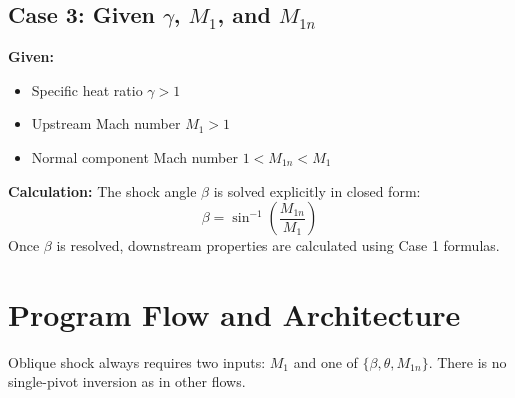 \subsection*{Case 3: Given $\gamma$, $M_1$, and $M_{1n}$}

\textbf{Given:}
\begin{itemize}[nosep]
    \item Specific heat ratio $\gamma > 1$
    \item Upstream Mach number $M_1 > 1$
    \item Normal component Mach number $1 < M_{1n} < M_1$
\end{itemize}

\textbf{Calculation:} The shock angle $\beta$ is solved explicitly in closed form:
\begin{equation}
\beta = \sin^{-1}\left(\frac{M_{1n}}{M_1}\right)
\end{equation}
Once $\beta$ is resolved, downstream properties are calculated using Case 1 formulas.




\section{Program Flow and Architecture}

Oblique shock always requires two inputs: $M_1$ and one of $\{\beta,\theta,M_{1n}\}$. There is no single-pivot inversion as in other flows.


